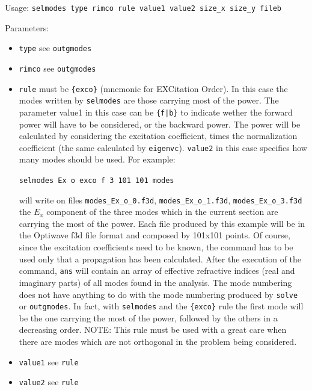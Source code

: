     Usage: \lstinline!selmodes type rimco rule value1 value2 size_x size_y fileb!

    Parameters:
    \begin{itemize}
    \item{\lstinline!type! see \lstinline!outgmodes! }
    \item{\lstinline!rimco! see \lstinline!outgmodes!}
    \item{\lstinline!rule!  must be \lstinline!{exco}! (mnemonic for EXCitation Order). In this case the modes written by \lstinline!selmodes! are those carrying most of the power. The parameter value1 in this case can be \lstinline!{f|b}! to indicate wether the forward power will have to be considered, or the backward power. The power will be calculated by considering the excitation coefficient, times the normalization coefficient (the same calculated by \lstinline!eigenvc!). \lstinline!value2! in this case specifies how many modes should be used. For example: 
    
    \lstinline!selmodes Ex o exco f 3 101 101 modes!
    
     will write on files \lstinline!modes_Ex_o_0.f3d!, \lstinline!modes_Ex_o_1.f3d!, \lstinline!modes_Ex_o_3.f3d! the $E_x$ component of the three modes which in the current section are carrying the most of the power. Each file produced by this example
            will be in the Optiwave f3d file format and composed by
            101x101 points. Of course, since the excitation coefficients need
            to be known, the command has to be used only that a propagation has been calculated. After the execution of the command, \lstinline!ans! will contain an array of effective refractive indices (real and imaginary parts) of all modes found in the analysis. The mode numbering does not have anything to do with the mode numbering produced by  \lstinline!solve! or  \lstinline!outgmodes!. In fact, with  \lstinline!selmodes! and the \lstinline!{exco}! rule the first mode will be the one carrying the most of the power, followed by the others in a decreasing order.
            NOTE: This rule must be used with a great care when there are modes
            which are not orthogonal in the problem being considered. }
            
    \item {\lstinline!value1! see \lstinline!rule!}
    \item {\lstinline!value2! see \lstinline!rule!}
    \end{itemize}


